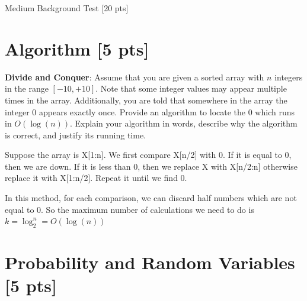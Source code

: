\documentclass[a4paper]{article}
\theoremstyle{definition}
\newenvironment{soln}{
    \leavevmode\color{blue}\ignorespaces
}{}
\begin{document}
\clearpage  %


\begin{center}
\Huge
Medium Background Test [20 pts]
\end{center}

\section{Algorithm [5 pts]}
\textbf{Divide and Conquer}: Assume that you are given a sorted array
with $n$ integers in the range $[-10, +10]$. Note that some integer values
may appear multiple times in the array. Additionally, you are
told that somewhere in the array the integer $0$ appears exactly once. Provide an
algorithm to locate the $0$ which runs in $O(\log(n))$. Explain your
algorithm in words, describe why the algorithm is correct, and justify
its running time.\\

\begin{soln}  
Suppose the array is X[1:n]. We first compare X[n/2] with 0. If it is equal to 0, then we are down. If it is less than 0, then we replace X with X[n/2:n] otherwise replace it with X[1:n/2]. Repeat it until we find 0.

In this method, for each comparison, we can discard half numbers which are not equal to 0. So the maximum number of calculations we need to do is $k = \log_2^n = O(\log(n))$ 

\end{soln}

\section{Probability and Random Variables [5 pts]}
\end{document}
